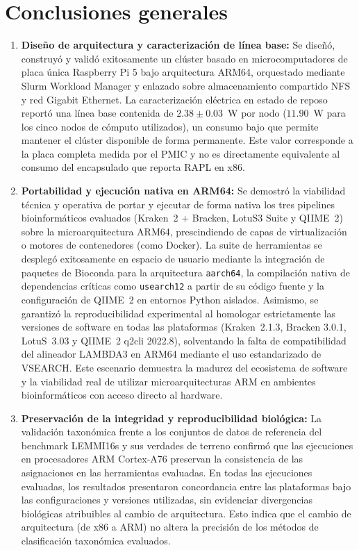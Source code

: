 \documentclass[12pt,oneside,spanish]{book}
\begin{document}
    \section{Conclusiones generales}
    
    \begin{enumerate}
        \item \textbf{Diseño de arquitectura y caracterización de línea base:} Se diseñó, construyó y validó exitosamente un clúster basado en microcomputadores de placa única Raspberry Pi 5 bajo arquitectura ARM64, orquestado mediante Slurm Workload Manager y enlazado sobre almacenamiento compartido NFS y red Gigabit Ethernet. La caracterización eléctrica en estado de reposo reportó una línea base contenida de $2.38 \pm 0.03$~W por nodo ($11.90$~W para los cinco nodos de cómputo utilizados), un consumo bajo que permite mantener el clúster disponible de forma permanente. Este valor corresponde a la placa completa medida por el PMIC y no es directamente equivalente al consumo del encapsulado que reporta RAPL en x86.
    
        \item \textbf{Portabilidad y ejecución nativa en ARM64:} Se demostró la viabilidad técnica y operativa de portar y ejecutar de forma nativa los tres pipelines bioinformáticos evaluados (Kraken~2 + Bracken, LotuS3 Suite y QIIME~2) sobre la microarquitectura ARM64, prescindiendo de capas de virtualización o motores de contenedores (como Docker). La suite de herramientas se desplegó exitosamente en espacio de usuario mediante la integración de paquetes de Bioconda para la arquitectura \texttt{aarch64}, la compilación nativa de dependencias críticas como \texttt{usearch12} a partir de su código fuente y la configuración de QIIME~2 en entornos Python aislados. Asimismo, se garantizó la reproducibilidad experimental al homologar estrictamente las versiones de software en todas las plataformas (Kraken~2.1.3, Bracken 3.0.1, LotuS~3.03 y QIIME~2 q2cli 2022.8), solventando la falta de compatibilidad del alineador LAMBDA3 en ARM64 mediante el uso estandarizado de VSEARCH. Este escenario demuestra la madurez del ecosistema de software y la viabilidad real de utilizar microarquitecturas ARM en ambientes bioinformáticos con acceso directo al hardware.
    
        \item \textbf{Preservación de la integridad y reproducibilidad biológica:} La validación taxonómica frente a los conjuntos de datos de referencia del benchmark LEMMI16s y sus verdades de terreno confirmó que las ejecuciones en procesadores ARM Cortex-A76 preservan la consistencia de las asignaciones en las herramientas evaluadas. En todas las ejecuciones evaluadas, los resultados presentaron concordancia entre las plataformas bajo las configuraciones y versiones utilizadas, sin evidenciar divergencias biológicas atribuibles al cambio de arquitectura. Esto indica que el cambio de arquitectura (de x86 a ARM) no altera la precisión de los métodos de clasificación taxonómica evaluados.
    

\end{enumerate}
\end{document}
